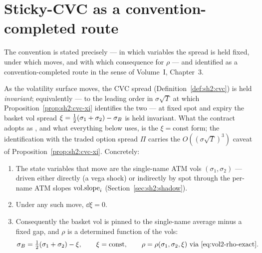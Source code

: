 \section{Sticky-CVC as a convention-completed route}\label{sec:sh2:convention}

The convention is stated precisely --- in which variables the spread is
held fixed, under which moves, and with which consequence for $\rho$ ---
and identified as a convention-completed route in the sense of Volume~I,
Chapter~3.

\begin{assumption}
\label{ass:sh2:sticky-cvc}
As the volatility surface moves, the CVC spread
(Definition~\ref{def:sh2:cvc}) is held \emph{invariant}; equivalently ---
to the leading order in $\sigma\sqrt{T}$ at which
Proposition~\ref{prop:sh2:cvc-xi} identifies the two --- at fixed spot and
expiry the basket vol spread
$\xi = \tfrac12(\sigma_1 + \sigma_2) - \sigma_B$ is held invariant. What the
contract adopts as \stickycvc{}, and what everything below uses, is the
$\xi = \text{const}$ form; the identification with the traded option
spread $\Pi$ carries the $O((\sigma\sqrt{T})^3)$ caveat of
Proposition~\ref{prop:sh2:cvc-xi}. Concretely:
\begin{enumerate}[label=(\roman*)]
\item The state variables that move are the single-name ATM vols
  $(\sigma_1, \sigma_2)$ --- driven either directly (a vega shock) or
  indirectly by spot through the per-name ATM slopes $\mathrm{vol.slope}_i$
  (Section~\ref{sec:sh2:shadow}).
\item Under any such move, $\dd \xi = 0$.
\item Consequently the basket vol is pinned to the single-name average
  minus a fixed gap, and $\rho$ is a determined function of the vols:
  \begin{equation}\label{eq:sh2:pinned}
    \sigma_B = \tfrac12(\sigma_1 + \sigma_2) - \xi,
    \qquad \xi = \text{const},
    \qquad \rho = \rho(\sigma_1, \sigma_2, \xi)
    \ \text{via \eqref{eq:vol2-rho-exact}}.
  \end{equation}
\end{enumerate}
\end{assumption}

